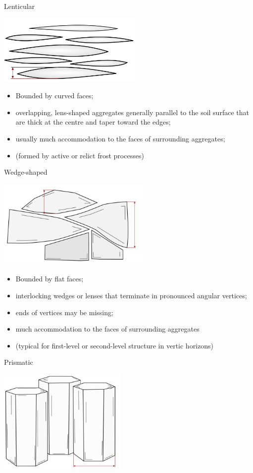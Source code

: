 \documentclass[
  letterpaper,
  DIV=11,
  numbers=noendperiod]{scrreprt}
\providecommand{\tightlist}{%
  \setlength{\itemsep}{0pt}\setlength{\parskip}{0pt}}\usepackage{longtable,booktabs,array}
\begin{document}
Lenticular

\includegraphics{./table_8-41-04.png}

\begin{itemize}
\tightlist
\item
  Bounded by curved faces;
\item
  overlapping, lens-shaped aggregates generally parallel to the soil
  surface that are thick at the centre and taper toward the edges;
\item
  usually much accommodation to the faces of surrounding aggregates;
\item
  (formed by active or relict frost processes)
\end{itemize}

Wedge-shaped

\includegraphics{./table_8-41-05.png}

\begin{itemize}
\tightlist
\item
  Bounded by flat faces;
\item
  interlocking wedges or lenses that terminate in pronounced angular
  vertices;
\item
  ends of vertices may be missing;
\item
  much accommodation to the faces of surrounding aggregates
\item
  (typical for first-level or second-level structure in vertic horizons)
\end{itemize}

Prismatic

\includegraphics{./table_8-41-06.png}
\end{document}
